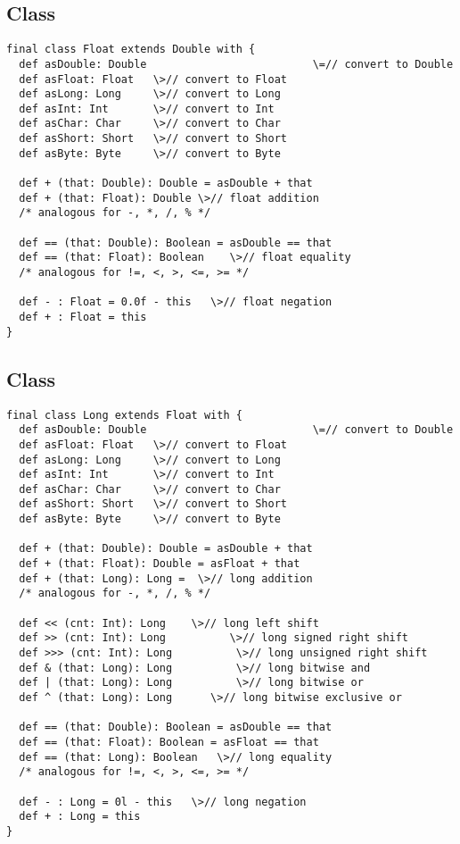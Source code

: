 \documentclass[11pt]{report}
\begin{document}
\subsection{Class }

\begin{verbatim}
final class Float extends Double with {
  def asDouble: Double                          \=// convert to Double
  def asFloat: Float   \>// convert to Float
  def asLong: Long     \>// convert to Long
  def asInt: Int       \>// convert to Int
  def asChar: Char     \>// convert to Char
  def asShort: Short   \>// convert to Short
  def asByte: Byte     \>// convert to Byte

  def + (that: Double): Double = asDouble + that
  def + (that: Float): Double \>// float addition
  /* analogous for -, *, /, % */

  def == (that: Double): Boolean = asDouble == that
  def == (that: Float): Boolean    \>// float equality
  /* analogous for !=, <, >, <=, >= */

  def - : Float = 0.0f - this   \>// float negation
  def + : Float = this
}
\end{verbatim}

\subsection{Class }

\begin{verbatim}
final class Long extends Float with {
  def asDouble: Double                          \=// convert to Double
  def asFloat: Float   \>// convert to Float
  def asLong: Long     \>// convert to Long
  def asInt: Int       \>// convert to Int
  def asChar: Char     \>// convert to Char
  def asShort: Short   \>// convert to Short
  def asByte: Byte     \>// convert to Byte

  def + (that: Double): Double = asDouble + that
  def + (that: Float): Double = asFloat + that
  def + (that: Long): Long =  \>// long addition
  /* analogous for -, *, /, % */

  def << (cnt: Int): Long    \>// long left shift
  def >> (cnt: Int): Long          \>// long signed right shift
  def >>> (cnt: Int): Long          \>// long unsigned right shift
  def & (that: Long): Long          \>// long bitwise and
  def | (that: Long): Long          \>// long bitwise or
  def ^ (that: Long): Long	    \>// long bitwise exclusive or

  def == (that: Double): Boolean = asDouble == that
  def == (that: Float): Boolean = asFloat == that
  def == (that: Long): Boolean   \>// long equality
  /* analogous for !=, <, >, <=, >= */

  def - : Long = 0l - this   \>// long negation
  def + : Long = this
}
\end{verbatim}
\end{document}

